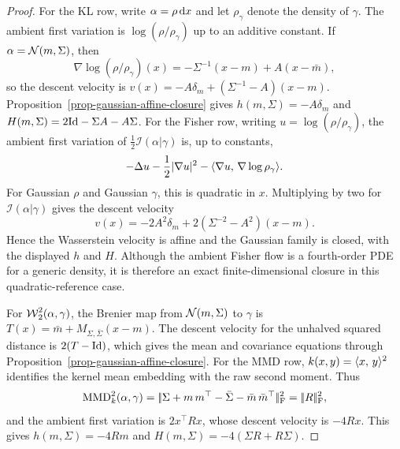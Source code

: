 \begin{proof}
	For the KL row, write $\alpha=\rho\,\mathrm{d} x$ and let $\rho_\gamma$ denote the density of $\gamma$. The ambient first variation is \(\log(\rho/\rho_\gamma)\) up to an additive constant. If \(\alpha=\mathcal{N}(m,\Sigma)\), then
	\[
		\nabla\log(\rho/\rho_\gamma)(x)
		=
		-\Sigma^{-1}(x-m)+A(x-\bar m),
	\]
	so the descent velocity is
	\(v(x)=-A\delta_m+(\Sigma^{-1}-A)(x-m)\).
	Proposition~\ref{prop-gaussian-affine-closure} gives \(h(m,\Sigma)=-A\delta_m\) and \(H(m,\Sigma)=2\mathrm{Id}-\Sigma A-A\Sigma\). For the Fisher row, writing \(u=\log(\rho/\rho_\gamma)\), the ambient first variation of \(\frac12\mathcal I(\alpha|\gamma)\) is, up to constants,
	\[
		-\Delta u-\frac12|\nabla u|^2-\langle \nabla u,\,\nabla\log\rho_\gamma\rangle.
	\]
	For Gaussian \(\rho\) and Gaussian \(\gamma\), this is quadratic in \(x\). Multiplying by two for \(\mathcal I(\alpha|\gamma)\) gives the descent velocity
	\[
		v(x)=-2A^2\delta_m+2(\Sigma^{-2}-A^2)(x-m).
	\]
	Hence the Wasserstein velocity is affine and the Gaussian family is closed, with the displayed \(h\) and \(H\). Although the ambient Fisher flow is a fourth-order PDE for a generic density, it is therefore an exact finite-dimensional closure in this quadratic-reference case.

	For \(\operatorname{\mathcal{W}}_2^2(\alpha,\gamma)\), the Brenier map from \(\mathcal{N}(m,\Sigma)\) to \(\gamma\) is
	\(T(x)=\bar m+M_{\Sigma,\bar\Sigma}(x-m)\).
	The descent velocity for the unhalved squared distance is \(2(T-\mathrm{Id})\), which gives the mean and covariance equations through Proposition~\ref{prop-gaussian-affine-closure}. For the MMD row, \(k(x,y)=\langle x,\,y\rangle^2\) identifies the kernel mean embedding with the raw second moment. Thus
	\[
		\operatorname{MMD}_k^2(\alpha,\gamma)
		=
		|\!| \Sigma+m\,m^\top-\bar\Sigma-\bar m\,\bar m^\top |\!|_{\mathrm F}^2
		=
		|\!| R |\!|_{\mathrm F}^2,
	\]
	and the ambient first variation is \(2x^\top R x\), whose descent velocity is \(-4Rx\). This gives \(h(m,\Sigma)=-4R m\) and \(H(m,\Sigma)=-4(\Sigma R+R\Sigma)\).


\end{proof}
